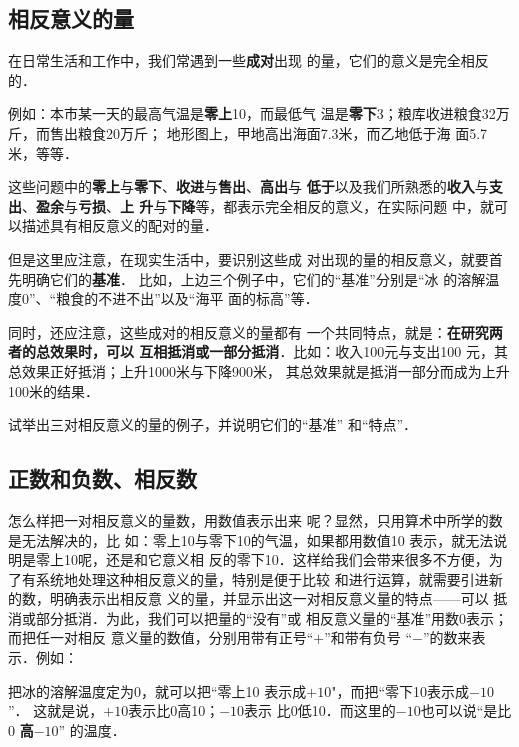 \subsection{相反意义的量}

在日常生活和工作中，我们常遇到一些\textbf{成对}出现
的量，它们的意义是完全相反的．

例如：本市某一天的最高气温是\textbf{零上}10\oc，而最低气
温是\textbf{零下}3\oc；粮库收进粮食32万斤，而售出粮食20万斤；
地形图上，甲地高出海面7.3米，而乙地低于海
面5.7米，等等．

这些问题中的\textbf{零上}与\textbf{零下}、\textbf{收进}与\textbf{售出}、\textbf{高出}与
\textbf{低于}以及我们所熟悉的\textbf{收入}与\textbf{支出}、\textbf{盈余}与\textbf{亏损}、\textbf{上
	升}与\textbf{下降}等，都表示完全相反的意义，在实际问题
中，就可以描述具有相反意义的配对的量．

但是这里应注意，在现实生活中，要识别这些成
对出现的量的相反意义，就要首先明确它们的\textbf{基准}．
比如，上边三个例子中，它们的“基准”分别是“冰
的溶解温度0\oc”、“粮食的不进不出”以及“海平
面的标高”等．

同时，还应注意，这些成对的相反意义的量都有
一个共同特点，就是：\textbf{在研究两者的总效果时，可以
	互相抵消或一部分抵消}．比如：收入100元与支出100
元，其总效果正好抵消；上升1000米与下降900米，
其总效果就是抵消一部分而成为上升100米的结果．

\begin{ex}
	试举出三对相反意义的量的例子，并说明它们的“基准”
	和“特点”．
\end{ex}

\subsection{正数和负数、相反数}
怎么样把一对相反意义的量数，用数值表示出来
呢？显然，只用算术中所学的数是无法解决的，比
如：零上10\oc 与零下10\oc 的气温，如果都用数值10
表示，就无法说明是零上10\oc 呢，还是和它意义相
反的零下10\oc．这样给我们会带来很多不方便，为
了有系统地处理这种相反意义的量，特别是便于比较
和进行运算，就需要引进新的数，明确表示出相反意
义的量，并显示出这一对相反意义量的特点——可以
抵消或部分抵消．为此，我们可以把量的“没有”或
相反意义量的“基准”用数0表示；而把任一对相反
意义量的数值，分别用带有正号“$+$”和带有负号
“$-$”的数来表示．例如：

把冰的溶解温度定为0\oc，就可以把“零上10\oc
表示成$+10$\oc"，而把“零下10\oc 表示成$-10$\oc”．
这就是说，$+ 10$\oc 表示比0\oc 高10\oc；$-10$\oc 表示
比0\oc 低10\oc ．而这里的$-10$\oc 也可以说“是比0\oc
\textbf{高}$-10$\oc” 的温度．

